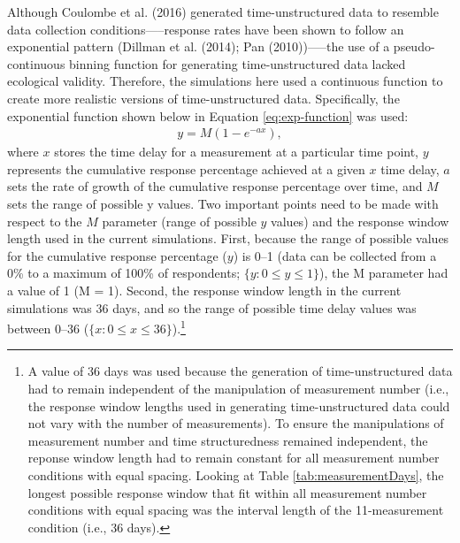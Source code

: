 \documentclass[
12pt, %
twoside,
english]{guelphthesis}
\theoremstyle{definition}
\theoremstyle{definition}
\theoremstyle{definition}
\theoremstyle{definition}
\theoremstyle{remark}
\begin{document}
Although Coulombe et al. (2016) generated time-unstructured data to resemble data collection conditions-----response rates have been shown to follow an exponential pattern (Dillman et al. (2014); Pan (2010))-----the use of a pseudo-continuous binning function for generating time-unstructured data lacked ecological validity. Therefore, the simulations here used a continuous function to create more realistic versions of time-unstructured data. Specifically, the exponential function shown below in Equation \ref{eq:exp-function} was used:
\begin{align}
y = M(1 - e^{-ax}),
\label{eq:exp-function} 
\end{align}
\noindent where \(x\) stores the time delay for a measurement at a particular time point, \(y\) represents the cumulative response percentage achieved at a given \(x\) time delay, \(a\) sets the rate of growth of the cumulative response percentage over time, and \(M\) sets the range of possible y values. Two important points need to be made with respect to the \(M\) parameter (range of possible \(y\) values) and the response window length used in the current simulations. First, because the range of possible values for the cumulative response percentage (\(y\)) is 0--1 (data can be collected from a 0\% to a maximum of 100\% of respondents; \(\{y : 0 \le y \le 1\}\)), the M parameter had a value of 1 (M = 1). Second, the response window length in the current simulations was 36 days, and so the range of possible time delay values was between 0--36 (\(\{x:0\le x \le36\}\)).\footnote{A value of 36 days was used because the generation of time-unstructured data had to remain independent of the manipulation of measurement number (i.e., the response window lengths used in generating time-unstructured data could not vary with the number of measurements). To ensure the manipulations of measurement number and time structuredness remained independent, the reponse window length had to remain constant for all measurement number conditions with equal spacing. Looking at Table \ref{tab:measurementDays}, the longest possible response window that fit within all measurement number conditions with equal spacing was the interval length of the 11-measurement condition (i.e., 36 days).}
\end{document}
